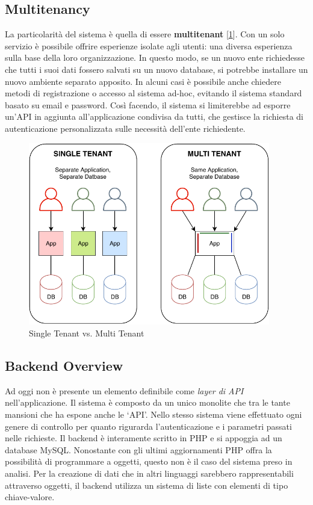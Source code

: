 \subsection{Multitenancy}
La particolarità del sistema è quella di essere \textbf{multitenant} [\ref{fig:multitenancy}]. Con un solo servizio è possibile offrire esperienze isolate agli utenti: una diversa esperienza sulla base della loro organizzazione. In questo modo, se un nuovo ente richiedesse che tutti i suoi dati fossero salvati su un nuovo database, si potrebbe installare un nuovo ambiente separato apposito. In alcuni casi è possibile anche chiedere metodi di registrazione o accesso al sistema ad-hoc, evitando il sistema standard basato su email e password. Così facendo, il sistema si limiterebbe ad esporre un'API in aggiunta all'applicazione condivisa da tutti, che gestisce la richiesta di autenticazione personalizzata sulle necessità dell'ente richiedente.
\begin{figure}[H]
    \centering
    \includegraphics[width=0.94\textwidth]{images/02_3_multitenancy.pdf}
    \caption{Single Tenant vs. Multi Tenant}
    \label{fig:multitenancy}
\end{figure}

\subsection{Backend Overview}
Ad oggi non è presente un elemento definibile come \emph{layer di API} nell’applicazione. Il sistema è composto da un unico monolite che tra le tante mansioni che ha espone anche le `API'. Nello stesso sistema viene effettuato ogni genere di controllo per quanto rigurarda l'autenticazione e i parametri passati nelle richieste. Il backend è interamente scritto in PHP e si appoggia ad un database MySQL. Nonostante con gli ultimi aggiornamenti PHP offra la possibilità di programmare a oggetti, questo non è il caso del sistema preso in analisi. Per la creazione di dati che in altri linguaggi sarebbero rappresentabili attraverso oggetti, il backend utilizza un sistema di liste con elementi di tipo chiave-valore.

